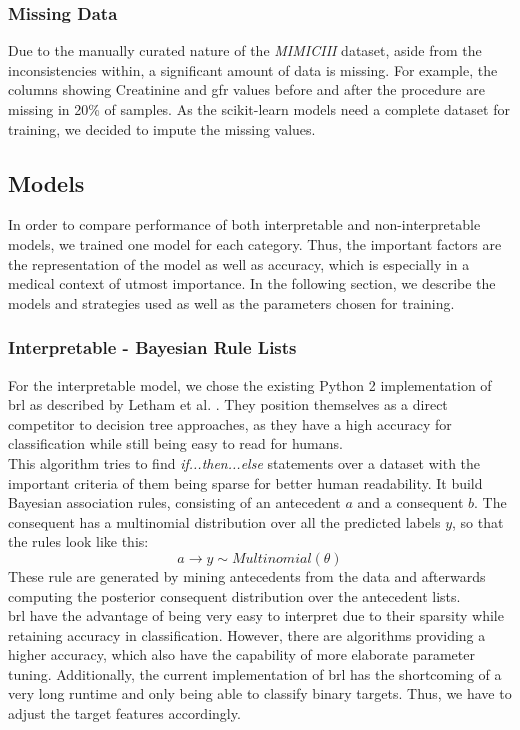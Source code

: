 \documentclass[conference,comsoc]{IEEEtran}
\begin{document}
\subsubsection*{Missing Data}
Due to the manually curated nature of the \emph{MIMICIII} dataset, aside from the inconsistencies within, a significant amount of data is missing. 
For example, the columns showing Creatinine and \gls{gfr} values before and after the procedure are missing in 20\% of samples.
As the scikit-learn models need a complete dataset for training, we decided to impute the missing values.


\subsection{Models}
In order to compare performance of both interpretable and non-interpretable models, we trained one model for each category.
Thus, the important factors are the representation of the model as well as accuracy, which is especially in a medical context of utmost importance.
In the following section, we describe the models and strategies used as well as the parameters chosen for training.

\subsubsection{Interpretable - Bayesian Rule Lists}
For the interpretable model, we chose the existing Python 2 implementation of \gls{brl} as described by Letham et al. \cite{Letham2015}.
They position themselves as a direct competitor to decision tree approaches, as they have a high accuracy for classification while still being easy to read for humans. \\
This algorithm tries to find \emph{if...then...else} statements over a dataset with the important criteria of them being sparse for better human readability. 
It build Bayesian association rules, consisting of an antecedent $a$ and a consequent $b$.
The consequent has a multinomial distribution over all the predicted labels $y$, so that the rules look like this:
\begin{equation}
a \rightarrow y \sim Multinomial(\theta)
\end{equation}
These rule are generated by mining antecedents from the data and afterwards computing the posterior consequent distribution over the antecedent lists. \\
\gls{brl} have the advantage of being very easy to interpret due to their sparsity while retaining accuracy in classification.
However, there are algorithms providing a higher accuracy, which also have the capability of more elaborate parameter tuning.
Additionally, the current implementation of \gls{brl} has the shortcoming of a very long runtime and only being able to classify binary targets. 
Thus, we have to adjust the target features accordingly.
\end{document}
